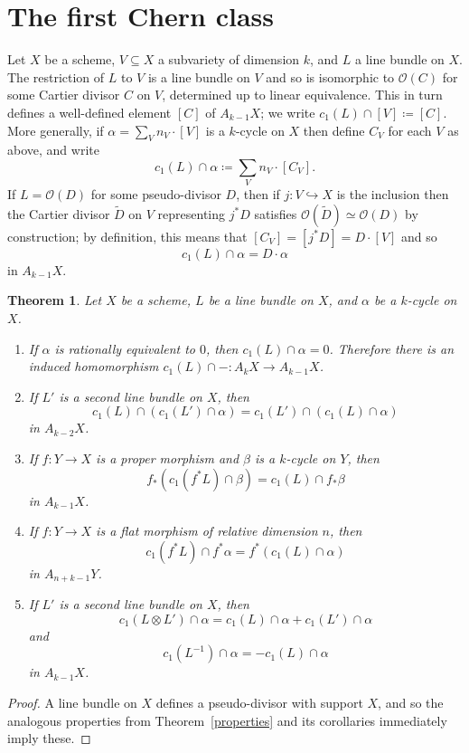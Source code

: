 \documentclass[leqno, openany]{memoir}
\newtheorem{thm}{Theorem}[section]
\theoremstyle{definition}
\theoremstyle{remark}
\theoremstyle{plain}
\theoremstyle{definition}
\theoremstyle{remark}
\newcommand{\msc}[1]{\mathscr{#1}}
\begin{document}
\section{The first Chern class}
Let $X$ be a scheme, $V \subseteq X$ a subvariety of dimension $k$, and $L$ a line bundle on $X$. The restriction of $L$ to $V$ is a line bundle on $V$ and so is isomorphic to $\msc{O}(C)$ for some Cartier divisor $C$ on $V$, determined up to linear equivalence. This in turn defines a well-defined element $[C]$ of $A_{k-1} X$; we write $c_1(L) \cap [V] \coloneqq [C]$. More generally, if $\alpha = \sum_V n_V \cdot [V]$ is a $k$-cycle on $X$ then define $C_V$ for each $V$ as above, and write \[ c_1(L) \cap \alpha \coloneqq \sum_V n_V \cdot [C_V] . \] If $L = \msc{O}(D)$ for some pseudo-divisor $D$, then if $j\colon V \hookrightarrow X$ is the inclusion then the Cartier divisor $\tilde D$ on $V$ representing $j^* D$ satisfies $\msc{O}(\tilde D) \simeq \msc{O}(D)$ by construction; by definition, this means that $[C_V] = [j^* D] = D \cdot [V]$ and so \[ c_1(L) \cap \alpha = D \cdot \alpha \] in $A_{k-1} X$.

\begin{thm}
\label{Chern properties}
Let $X$ be a scheme, $L$ be a line bundle on $X$, and $\alpha$ be a $k$-cycle on $X$.
\begin{enumerate}[label=(\alph*)]
\item If $\alpha$ is rationally equivalent to $0$, then $c_1(L) \cap \alpha = 0$. Therefore there is an induced homomorphism $c_1(L) \cap - \colon A_k X \to A_{k-1} X$.
\item If $L'$ is a second line bundle on $X$, then \[ c_1(L) \cap (c_1(L') \cap \alpha) = c_1(L') \cap (c_1(L) \cap \alpha) \] in $A_{k-2}X$.
\item If $f\colon Y \to X$ is a proper morphism and $\beta$ is a $k$-cycle on $Y$, then \[ f_* (c_1(f^* L) \cap \beta) = c_1(L) \cap f_* \beta \] in $A_{k-1} X$.
\item If $f\colon Y \to X$ is a flat morphism of relative dimension $n$, then \[ c_1(f^* L) \cap f^* \alpha = f^* (c_1(L) \cap \alpha) \] in $A_{n+k-1} Y$.
\item If $L'$ is a second line bundle on $X$, then \[ c_1(L \otimes L') \cap \alpha = c_1(L) \cap \alpha + c_1(L') \cap \alpha \] and \[ c_1(L^{-1}) \cap \alpha = - c_1(L) \cap \alpha \] in $A_{k-1} X$.
\end{enumerate}
\end{thm}
\begin{proof}
A line bundle on $X$ defines a pseudo-divisor with support $X$, and so the analogous properties from Theorem~\ref{properties} and its corollaries immediately imply these.
\end{proof}
\end{document}
